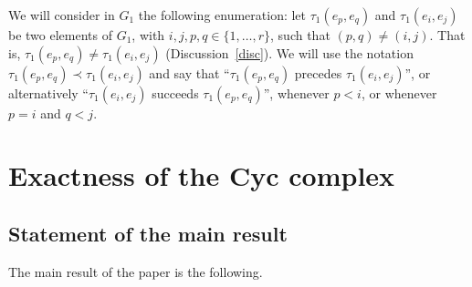\begin{remark}\label{induced-srle}
We will consider in $G_1$ the following enumeration: let
$\tau_1(e_p,e_q)$ and $\tau_1(e_i,e_j)$ be two elements of $G_1$, with
$i,j,p,q\in\{1,\ldots ,r\}$, such that $(p,q)\neq (i,j)$. That is,
$\tau_1(e_p,e_q)\neq\tau_1(e_i,e_j)$ (\cf Discussion~\ref{disc}).  We
will use the notation $\tau_1(e_p,e_q)\prec \tau_1(e_i,e_j)$ and say
that ``$\tau_1(e_p,e_q)$ precedes $\tau_1(e_i,e_j)$'', or
alternatively ``$\tau_1(e_i,e_j)$ succeeds $\tau_1(e_p,e_q)$'',
whenever $p<i$, or whenever $p=i$ and $q<j$.
\end{remark}

\section{Exactness of the Cyc complex}

\subsection{Statement of the main result}

The main result of the paper is the following.

